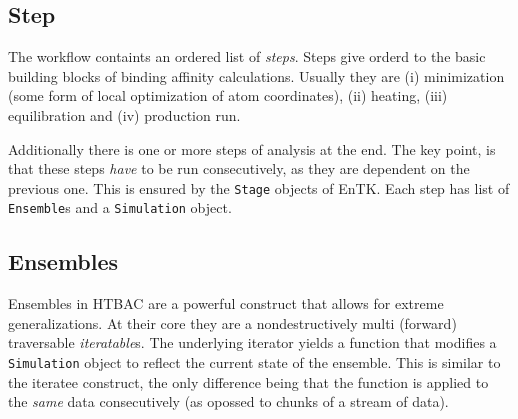 
\subsection{Step}


The workflow containts an ordered list of \emph{steps}. Steps give
 orderd to the basic building blocks of binding affinity
calculations. Usually they are (i) minimization (some form of local
optimization of atom coordinates), (ii) heating, (iii) equilibration and (iv)
production run.

Additionally there is one or more steps of analysis at the end. The key
point, is that these steps \emph{have} to be run consecutively, as they are
dependent on the previous one. This is ensured by the \texttt{Stage} objects
of EnTK\@. Each step has list of \texttt{Ensemble}s and a \texttt{Simulation}
object.

\subsection{Ensembles} 




Ensembles in HTBAC are a powerful construct that allows for extreme
generalizations. At their core they are a nondestructively multi (forward)
traversable \emph{iteratable}s. The underlying iterator yields a function that
modifies a \texttt{Simulation} object to reflect the current state of the
ensemble. This is similar to the iteratee construct, the only difference being
that the function is applied to the \emph{same} data consecutively (as opossed
to chunks of a stream of data).

